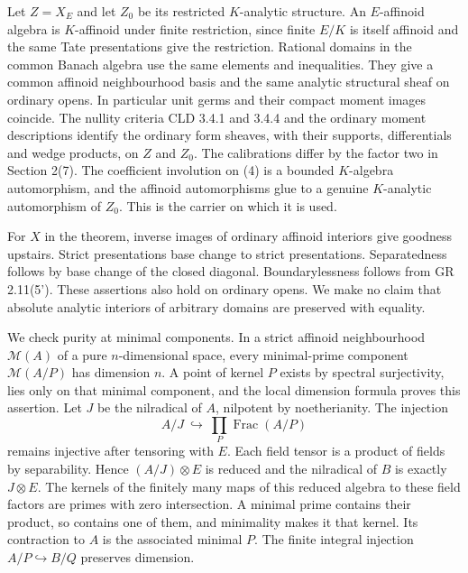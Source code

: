 \documentclass[
  11pt,
]{article}
\begin{document}
Let \(Z=X_E\) and let \(Z_0\) be its restricted \(K\)-analytic
structure. An \(E\)-affinoid algebra is \(K\)-affinoid under finite
restriction, since finite \(E/K\) is itself affinoid and the same Tate
presentations give the restriction. Rational domains in the common
Banach algebra use the same elements and inequalities. They give a
common affinoid neighbourhood basis and the same analytic structural
sheaf on ordinary opens. In particular unit germs and their compact
moment images coincide. The nullity criteria CLD 3.4.1 and 3.4.4 and the
ordinary moment descriptions identify the ordinary form sheaves, with
their supports, differentials and wedge products, on \(Z\) and \(Z_0\).
The calibrations differ by the factor two in Section 2(7). The
coefficient involution on (4) is a bounded \(K\)-algebra automorphism,
and the affinoid automorphisms glue to a genuine \(K\)-analytic
automorphism of \(Z_0\). This is the carrier on which it is used.

For \(X\) in the theorem, inverse images of ordinary affinoid interiors
give goodness upstairs. Strict presentations base change to strict
presentations. Separatedness follows by base change of the closed
diagonal. Boundarylessness follows from GR 2.11(5'). These assertions
also hold on ordinary opens. We make no claim that absolute analytic
interiors of arbitrary domains are preserved with equality.

We check purity at minimal components. In a strict affinoid
neighbourhood \(\mathcal M(A)\) of a pure \(n\)-dimensional space, every
minimal-prime component \(\mathcal M(A/P)\) has dimension \(n\). A point
of kernel \(P\) exists by spectral surjectivity, lies only on that
minimal component, and the local dimension formula proves this
assertion. Let \(J\) be the nilradical of \(A\), nilpotent by
noetherianity. The injection \[
 A/J\ \hookrightarrow\ \prod_P\operatorname{Frac}(A/P)
\] remains injective after tensoring with \(E\). Each field tensor is a
product of fields by separability. Hence \((A/J)\otimes E\) is reduced
and the nilradical of \(B\) is exactly \(J\otimes E\). The kernels of
the finitely many maps of this reduced algebra to these field factors
are primes with zero intersection. A minimal prime contains their
product, so contains one of them, and minimality makes it that kernel.
Its contraction to \(A\) is the associated minimal \(P\). The finite
integral injection \(A/P\hookrightarrow B/Q\) preserves dimension.
\end{document}

